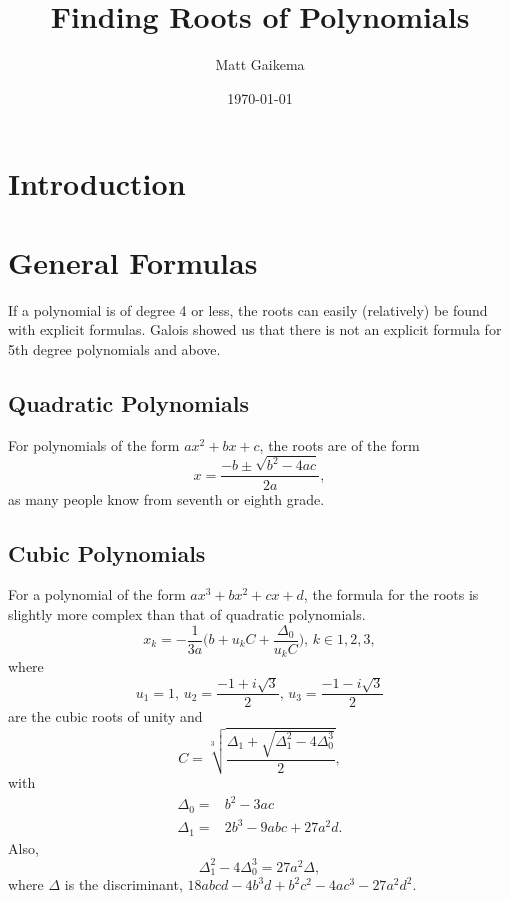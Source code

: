 \documentclass{article}
\title{Finding Roots of Polynomials}
\author{Matt Gaikema}
\date{\today}
\begin{document}
\maketitle


\section{Introduction}




\section{General Formulas}

If a polynomial is of degree 4 or less, the roots can easily (relatively) be found with explicit formulas.
Galois showed us that there is not an explicit formula for 5th degree polynomials and above.

\subsection{Quadratic Polynomials}

For polynomials of the form $ax^2+bx+c$, the roots are of the form
\begin{equation}
	x = \frac{-b\pm\sqrt{b^2-4ac}}{2a},
\end{equation}
as many people know from seventh or eighth grade. 

\subsection{Cubic Polynomials}

For a polynomial of the form $ax^3+bx^2+cx+d$, the formula for the roots is slightly more complex than that of quadratic polynomials.\cite{wiki:cubic}
\begin{equation}
	x_k=-\frac{1}{3a}\bigg(b+u_kC+\frac{\Delta_0}{u_kC}\bigg),\,k\in{1,2,3},
\end{equation}
where 
\[u_1=1,\,u_2=\frac{-1+i\sqrt{3}}{2},\,u_3=\frac{-1-i\sqrt{3}}{2}\]
are the cubic roots of unity and
\[C=\sqrt[3]{\frac{\Delta_1+\sqrt{\Delta_1^2-4\Delta_0^3}}{2}},\]
with 
\begin{align*}
	\Delta_0 =& b^2-3ac \\
	\Delta_1 =& 2b^3-9abc+27a^2d.
\end{align*}
Also,
\[\Delta_1^2-4\Delta_0^3=27a^2\Delta,\]
where $\Delta$ is the discriminant, $18abcd-4b^3d+b^2c^2-4ac^3-27a^2d^2$.
\end{document}

